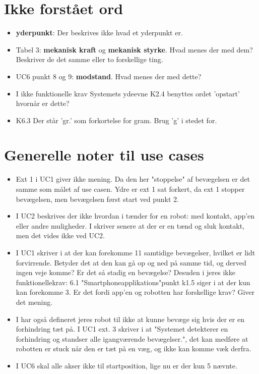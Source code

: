 \documentclass[a4paper,12pt,fleqn,oneside]{article}
\begin{document}
\section{Ikke forstået ord}

\begin{itemize}
    \item \textbf{yderpunkt}: Der beskrives ikke hvad et yderpunkt er.
    \item Tabel 3: \textbf{mekanisk kraft} og \textbf{mekanisk styrke}. Hvad menes der med dem? Beskriver de det samme eller to forskellige ting.
    \item UC6 punkt 8 og 9: \textbf{modstand}. Hvad menes der med dette?
    \item I ikke funktionelle krav Systemets ydeevne K2.4 benyttes ordet 'opstart' hvornår er dette?
    \item K6.3 Der står 'gr.' som  forkortelse for gram. Brug 'g' i stedet for. 
\end{itemize}

\section{Generelle noter til use cases}
\begin{itemize}
\item Ext 1 i UC1 giver ikke mening. Da den her "stoppelse" af bevægelsen er det samme som målet af use casen. Ydre er ext 1 sat forkert, da ext 1 stopper bevægelsen, men bevægelsen først start ved punkt 2. 
\item I UC2 beskrives der ikke hvordan i tænder for en robot: med kontakt, app'en eller andre muligheder. I skriver senere at der er en tænd og sluk kontakt, men det vides ikke ved UC2.
\item I UC1 skriver i at der kan forekomme 11 samtidige bevægelser, hvilket er lidt forvirrende. Betyder det at den kan gå op og ned på samme tid, og derved ingen veje komme? Er det så stadig en bevægelse? Desuden i jeres ikke funktionellekrav: 6.1 "Smartphoneapplikations"\space punkt k1.5  siger i at der kun kan forekomme 3. Er det fordi app'en og robotten har forskellige krav? Giver det mening.
\item I har også defineret jeres robot til ikke at kunne bevæge sig hvis der er en forhindring tæt på. I UC1 ext. 3 skriver i at "Systemet detekterer en forhindring og standser alle igangværende bevægelser.", det kan medføre at robotten er stuck når den er tæt på en væg, og ikke kan komme væk derfra.
\item I UC6 skal alle akser ikke til startposition, lige nu er der kun 5 nævnte. 
\end{itemize}
\end{document}
